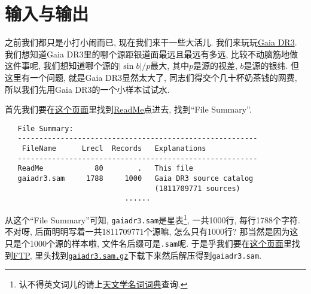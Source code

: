 \chapter{输入与输出}\label{io}

之前我们都只是小打小闹而已, 现在我们来干一些大活儿. 我们来玩玩\href{https://cdsarc.cds.unistra.fr/viz-bin/cat/I/355}{Gaia DR3}. 我们想知道Gaia DR3里的哪个源距银道面最远且最远有多远, 比较不动脑筋地做这件事呢, 我们想知道哪个源的$\left\lvert \sin b\right\rvert/p$最大, 其中$p$是源的视差, $b$是源的银纬. 但这里有一个问题, 就是Gaia DR3显然太大了, 同志们得交个几十杯奶茶钱的网费, 所以我们先用Gaia DR3的一个小样本试试水.

首先我们要在\href{https://cdsarc.cds.unistra.fr/viz-bin/cat/I/355}{这个页面}里找到\href{https://cdsarc.cds.unistra.fr/viz-bin/ReadMe/I/355?format=html&tex=true}{ReadMe}点进去, 找到``File Summary''.
\begin{lstlisting}
   File Summary:
   --------------------------------------------------------
    FileName      Lrecl  Records   Explanations
   --------------------------------------------------------
   ReadMe            80        .   This file
   gaiadr3.sam     1788     1000   Gaia DR3 source catalog
                                   (1811709771 sources)
                            ......
\end{lstlisting}
从这个``File Summary''可知, \texttt{gaiadr3.sam}是星表\footnote{认不得英文词儿的请上\href{https://nadc.china-vo.org/astrodict/}{天文学名词词典}查询.}, 一共1000行, 每行1788个字符. 不对呀, 后面明明写着一共1811709771个源嘛, 怎么只有1000行? 那当然是因为这只是个1000个源的样本啦, 文件名后缀可是\texttt{.sam}呢. 于是乎我们要在\href{https://cdsarc.cds.unistra.fr/viz-bin/cat/I/355}{这个页面}里找到\href{https://cdsarc.cds.unistra.fr/ftp/I/355}{FTP}, 里头找到\href{https://cdsarc.cds.unistra.fr/ftp/I/355/gaiadr3.sam.gz}{\texttt{gaiadr3.sam.gz}}下载下来然后解压得到\texttt{gaiadr3.sam}.


